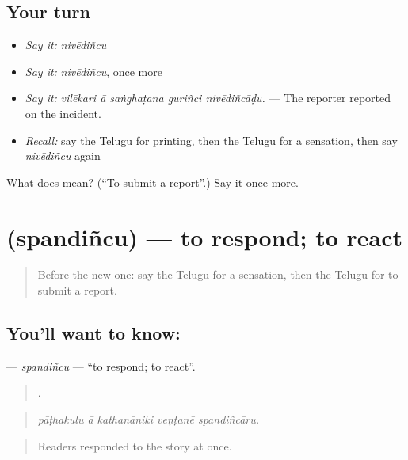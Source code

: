 \subsection*{Your turn}
\begin{itemize}
\raggedright
  \item \emph{Say it:} \emph{nivēdiñcu}
  \item \emph{Say it:} \emph{nivēdiñcu}, once more
  \item \emph{Say it:} \emph{vilēkari ā saṅghaṭana guriñci nivēdiñcāḍu.} — The reporter reported on the incident.
  \item \emph{Recall:} say the Telugu for printing, then the Telugu for a sensation, then say \emph{nivēdiñcu} again
\end{itemize}

\begin{tcolorbox}[breakable,colback=teal!4,colframe=teal!35!black,title={Before you move on}]
What does  mean? (\textquotedblleft{}To submit a report\textquotedblright{}.) Say it once more.
\end{tcolorbox}
\section[\texorpdfstring{\te{స్పందించు} (spandiñcu)}{స్పందించు (spandiñcu)}]{ (spandiñcu) — to respond; to react}

\label{lesson:TE-C375-spandincu}



\begin{quote}
Before the new one: say the Telugu for a sensation, then the Telugu for to submit a report.
\end{quote}

\subsection*{You'll want to know: }
\textbf{} — \emph{spandiñcu} — \textquotedblleft{}to respond; to react\textquotedblright{}.

\begin{quote}
    .
\end{quote}

\begin{quote}
\emph{pāṭhakulu ā kathanāniki veṇṭanē spandiñcāru.}
\end{quote}

\begin{quote}
Readers responded to the story at once.
\end{quote}

